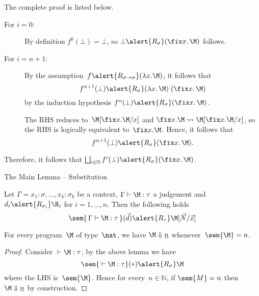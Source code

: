 \begin{frame}
  The complete proof is listed below.
  \begin{description}
    \item[For $i = 0$:] By definition $f^0(\bot) = \bot$, so
      $\bot \alert{\mathrel{R_\sigma}} (\fix x.\, \M)$ follows.
    \item[For $i = n + 1$:]
      By the assumption~$f\alert{\mathrel{R_{\sigma\to\sigma}}}(\lambda x.\M)$, it
      follows that
      \[
        f^{n+1}(\bot)
        \alert{\mathrel{R_\sigma}} (\lambda x.\,\M)\; (\fix x.\,\M)
      \]
      by the induction hypothesis
      $f^n(\bot) \alert{\mathrel{R_\sigma}} (\fix x.\, \M)$. 

      The RHS reduces to~$\M[\fix x.\M /x]$ and $\fix x.\M \leadsto
      \M[\fix x.\M / x]$, so the RHS is logically equivalent to~$\fix x.\M$.
      Hence, it follows that
      \[
        f^{n+1}(\bot) \alert{\mathrel{R_\sigma}} (\fix x.\,\M).
      \]
  \end{description}
  Therefore, it follows that $\bigsqcup_{i \in \mathbb{N}} f^{i}(\bot)
  \alert{\mathrel{R_\sigma}} (\fix x.\, \M)$. 
\end{frame}
\begin{frame}{The Main Lemma -- Substitution}
  \begin{lemma}[Substitution]
    Let $\Gamma = x_1:\sigma, \dots, x_k:\sigma_k$ be a context, $\Gamma \vdash
    \M:\tau$ a judgement and $d_i \alert{\mathrel{R_{\sigma_i}}} \N_i$
    for $i = 1, \dots, n$. Then the following holds
    \[
      \sem{\, \Gamma \vdash \M : \tau\,}(\vec{d})
      \alert{\mathrel{R_\tau}}
      \M[\vec{N}/\vec{x}]
    \]
  \end{lemma}
  \begin{theorem}[Completeness]
    For every program~$\M$ of type~$\nat$,
    we have $\M \Downarrow \underline{n}$ whenever~$\sem{\M} = n$. 
  \end{theorem}
  \begin{proof}
    Consider ${}\vdash \M : \tau$, by the above lemma we have
    \[
      \sem{{}\vdash \M:\tau}(*) \alert{\mathrel{R_\sigma}} \M
    \]
    where the LHS is~$\sem{\M}$. Hence for
    every~$n \in \mathbb{N}$, if $\sem{M} = n$ then $\M \Downarrow
    \underline{n}$ by
    construction.
  \end{proof}
\end{frame}

